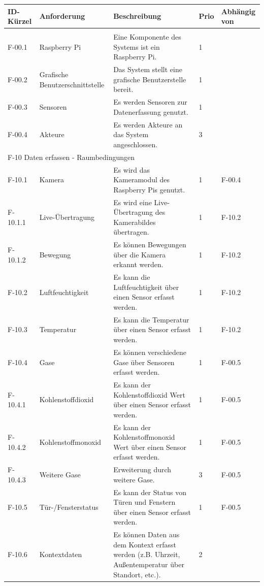\begin{tabularx}{\textwidth}{|l|X|X|l|l|}
	\toprule
	\textbf{ID-Kürzel} & \textbf{Anforderung} & \textbf{Beschreibung} & \textbf{Prio} & \textbf{Abhängig von} \\
	\hline
	\endhead
	\hline
	\caption{Anforderungen}
	\label{tab:anforderungen}
	\endfoot
	\multicolumn{5}{|l|}{F-00 Allgemein}\\
	\hline
	F-00.1 & Raspberry Pi & Eine Komponente des Systems ist ein Raspberry Pi. & 1 & \\
	F-00.2 & Grafische Benutzerschnittstelle & Das System stellt eine grafische Benutzerstelle bereit. & 1 & \\
	F-00.3 & Sensoren & Es werden Sensoren zur Datenerfassung genutzt. & 1 & \\
	F-00.4 & Akteure & Es werden Akteure an das System angeschlossen. & 3 & \\
	\hline
	\multicolumn{5}{|l|}{F-10 Daten erfassen - Raumbedingungen}\\
	\hline
	F-10.1   & Kamera & Es wird das Kameramodul des Raspberry Pis genutzt. & 1 & F-00.4\\
	F-10.1.1 & Live-Übertragung & Es wird eine Live-Übertragung des Kamerabildes übertragen. & 1 & F-10.2 \\
	F-10.1.2 & Bewegung & Es können Bewegungen über die Kamera erkannt werden. & 1 & F-10.2 \\
	F-10.2 & Luftfeuchtigkeit & Es kann die Luftfeuchtigkeit über einen Sensor erfasst werden. & 1 & F-10.2 \\
	F-10.3 & Temperatur & Es kann die Temperatur über einen Sensor erfasst werden. & 1 & F-10.2 \\
	F-10.4 & Gase & Es können verschiedene Gase über Sensoren erfasst werden.  & 1 & F-00.5\\
	F-10.4.1 & Kohlenstoffdioxid & Es kann der Kohlenstoffdioxid Wert über einen Sensor erfasst werden. & 1 & F-00.5\\
	F-10.4.2 & Kohlenstoffmonoxid & Es kann der Kohlenstoffmonoxid Wert über einen Sensor erfasst werden. & 1 & F-00.5\\
	F-10.4.3 & Weitere Gase & Erweiterung durch weitere Gase. & 3 & F-00.5\\
	F-10.5 & Tür-/Fensterstatus & Es kann der Status von Türen und Fenstern über einen Sensor erfasst werden.  & 1 & F-00.5\\
	F-10.6 & Kontextdaten & Es können Daten aus dem Kontext erfasst werden (z.B. Uhrzeit, Außentemperatur über Standort, etc.). & 2 & \\  

\end{tabularx}
